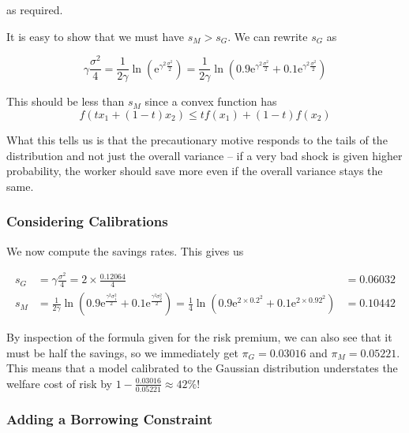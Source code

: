 \documentclass[12pt, letterpaper, parskip = full]{article}
\newcommand{\e}{\mathrm{e}}
\begin{document}
    as required.

    It is easy to show that we must have \(s_M > s_G\). We can rewrite \(s_G\) as 
    
    \[\gamma \frac{\sigma^2}{4} = \frac{1}{2 \gamma} \ln(\e^{\gamma^2 \frac{\sigma^2}{2}}) = \frac{1}{2 \gamma} \ln(0.9 \e^{\gamma^2 \frac{\sigma^2}{2}} + 0.1 \e^{\gamma^2 \frac{\sigma^2}{2}})  \]

    This should be less than \(s_M\) since a convex function has 
    \[f(t x_1 + (1-t) x_2) \leq tf(x_1) + (1-t) f(x_2)\] 

    What this tells us is that the precautionary motive responds to the tails of the distribution and not just the overall variance -- if a very bad shock is given higher probability, the worker should save more even if the overall variance stays the same.

    \subsubsection{Considering Calibrations}

    We now compute the savings rates. This gives us

    \begin{align*}
    s_G &= \gamma \frac{\sigma^2}{4} = 2 \times \frac{0.12064}{4} &= 0.06032 \\
    s_M &= \frac{1}{2\gamma} \ln\left( 0.9 \e^{\frac{\gamma^2 \sigma_1^2}{2}} + 0.1 \e^{\frac{\gamma^2 \sigma_2^2}{2}}\right) = \frac{1}{4} \ln \left( 0.9 \e^{2 \times 0.2^2} + 0.1 \e^{2 \times 0.92^2} \right) &= 0.10442
    \end{align*}

    By inspection of the formula given for the risk premium, we can also see that it must be half the savings, so we immediately get \(\pi_G = 0.03016\) and \(\pi_M = 0.05221\). This means that a model calibrated to the Gaussian distribution understates the welfare cost of risk by \(1 - \frac{0.03016}{0.05221} \approx 42\%\)!

    \subsubsection{Adding a Borrowing Constraint}
\end{document}
